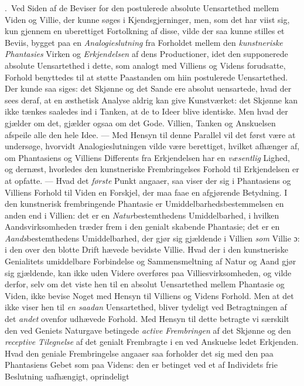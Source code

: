 \documentclass[12pt,a4paper]{book}
\newcommand{\opage}[1]{\marginnote{\footnotesize\textit{[#1]}}}
\begin{document}
.~Ved Siden af de Beviser for den postulerede absolute
Uensartethed mellem Viden og Villie, der kunne søges i
Kjendsgjerninger, men, som det har viist sig, kun gjennem en uberettiget
Fortolkning af disse, vilde der saa kunne stilles et Beviis, bygget paa en \emph{Analogieslutning} fra Forholdet mellem den \emph{kunstneriske Phantasies} Virken og \emph{Erkjendelsen} af dens Productioner, idet den supponerede
absolute Uensartethed i dette, som analogt med Villiens og Videns
forudsatte, Forhold benyttedes til at støtte Paastanden om hiin
postulerede Uensartethed. Der \opage{151}kunde saa siges: det Skjønne og det Sande ere absolut
uensartede, hvad der sees deraf, at en æsthetisk Analyse aldrig kan give Kunstværket: det
Skjønne kan ikke tænkes saaledes ind i Tanken, at de to Ideer blive identiske. Men hvad der
gjælder om det, gjælder ogsaa om det Gode. Villien, Tanken og Anskuelsen afspeile alle den
hele Idee. --- Med Hensyn til denne Parallel vil det først være at undersøge, hvorvidt
Analogieslutningen vilde være berettiget, hvilket afhænger af, om Phantasiens og Villiens
Differents fra Erkjendelsen har en \emph{væsentlig} Lighed, og dernæst, hvorledes den kunstneriske
Frembringelses Forhold til Erkjendelsen er at opfatte. --- Hvad det \emph{første} Punkt angaaer,
saa viser der sig i Phantasiens og Villiens Forhold til Viden en Forskjel, der maa faae en
afgjørende Betydning. I den kunstnerisk frembringende Phantasie er
Umiddelbarhedsbestemmelsen en anden end i Villien: det er en \emph{Natur}bestemthedens
Umiddelbarhed, i hvilken Aandsvirksomheden træder frem i den genialt skabende Phantasie; det
er en \emph{Aands}bestemthedens Umiddelbarhed, der gjør sig gjældende i Villien \emph{som} Villie ɔ: i den
over den blotte Drift hævede bevidste Villie. Hvad der i den kunstneriske Genialitets
umiddelbare Forbindelse og Sammensmeltning af Natur og Aand gjør sig gjældende, kan ikke
uden Videre overføres paa Villiesvirksomheden, og vilde derfor, selv om det viste hen til en
absolut Uensartethed mellem Phantasie og Viden, ikke bevise Noget med Hensyn til Villiens og
Videns Forhold. Men at det ikke viser hen til \emph{en saadan} Uensartethed, bliver tydeligt ved
Betragtningen af det \emph{andet} ovenfor udhævede Forhold. Med Hensyn til dette betragte vi
særskilt den ved Geniets Naturgave betingede \emph{active Frembringen} af det Skjønne og den
\emph{receptive Tilegnelse} af det genialt Frembragte i en ved Anskuelse ledet Erkjenden.
Hvad den geniale Frembringelse angaaer saa forholder det sig med den paa Phantasiens Gebet
som paa Videns: den er betinget ved et af Individets frie Beslutning uafhængigt, oprindeligt
\end{document}
